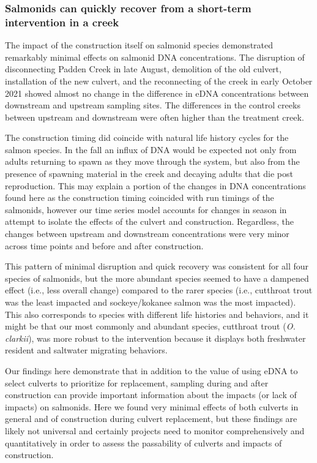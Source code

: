 \documentclass[
]{article}
\begin{document}
\hypertarget{salmonids-can-quickly-recover-from-a-short-term-intervention-in-a-creek}{%
\subsubsection{Salmonids can quickly recover from a short-term
intervention in a
creek}\label{salmonids-can-quickly-recover-from-a-short-term-intervention-in-a-creek}}

The impact of the construction itself on salmonid species demonstrated
remarkably minimal effects on salmonid DNA concentrations. The
disruption of disconnecting Padden Creek in late August, demolition of
the old culvert, installation of the new culvert, and the reconnecting
of the creek in early October 2021 showed almost no change in the
difference in eDNA concentrations between downstream and upstream
sampling sites. The differences in the control creeks between upstream
and downstream were often higher than the treatment creek.

The construction timing did coincide with natural life history cycles
for the salmon species. In the fall an influx of DNA would be expected
not only from adults returning to spawn as they move through the system,
but also from the presence of spawning material in the creek and
decaying adults that die post reproduction. This may explain a portion
of the changes in DNA concentrations found here as the construction
timing coincided with run timings of the salmonids, however our time
series model accounts for changes in season in attempt to isolate the
effects of the culvert and construction. Regardless, the changes between
upstream and downstream concentrations were very minor across time
points and before and after construction.

This pattern of minimal disruption and quick recovery was consistent for
all four species of salmonids, but the more abundant species seemed to
have a dampened effect (i.e., less overall change) compared to the rarer
species (i.e., cutthroat trout was the least impacted and
sockeye/kokanee salmon was the most impacted). This also corresponds to
species with different life histories and behaviors, and it might be
that our most commonly and abundant species, cutthroat trout (\emph{O.
clarkii}), was more robust to the intervention because it displays both
freshwater resident and saltwater migrating behaviors.

Our findings here demonstrate that in addition to the value of using
eDNA to select culverts to prioritize for replacement, sampling during
and after construction can provide important information about the
impacts (or lack of impacts) on salmonids. Here we found very minimal
effects of both culverts in general and of construction during culvert
replacement, but these findings are likely not universal and certainly
projects need to monitor comprehensively and quantitatively in order to
assess the passability of culverts and impacts of construction.
\end{document}
